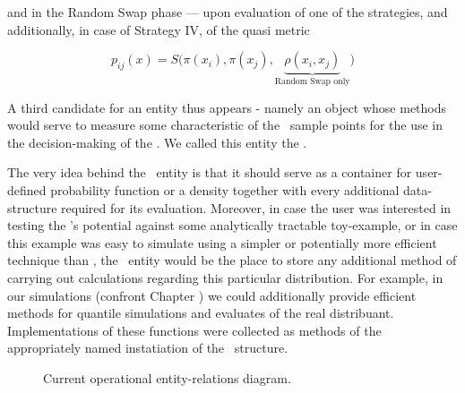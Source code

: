 \documentclass{book}
\begin{document}
and in the Random Swap phase --- upon evaluation of one of the strategies, and additionally, in case of Strategy IV, of the quasi metric	

\begin{equation*}
	p_{ij}(x) = S\Big(\pi(x_i),\pi(x_j), \underbrace{\rho(x_i, x_j)}_\text{Random Swap only}\Big)
\end{equation*}

 A third candidate for an entity thus appears - namely an object whose methods would serve to measure some characteristic of the \sspace\, sample points for the use in the decision-making of the \algo. We called this entity the \measure. 

The very idea behind the \measure\, entity is that it should serve as a container for user-defined probability function or a density together with every additional data-structure required for its evaluation. Moreover, in case the user was interested in testing the \PTalgo's potential against some analytically tractable toy-example, or in case this example was easy to simulate using a simpler or potentially more efficient technique than \mcmc, the \measure\,
 entity would be the place to store any additional method of carrying out calculations regarding this particular distribution. For example, in our simulations (confront Chapter ) we could  additionally provide efficient methods for quantile simulations and evaluates of the real distribuant. Implementations of these functions were collected as methods of the appropriately named instatiation of the \measure\, structure.  



\begin{figure}
	\caption{Current operational entity-relations diagram.}\label{objectStructure}
\end{figure}
\end{document}
